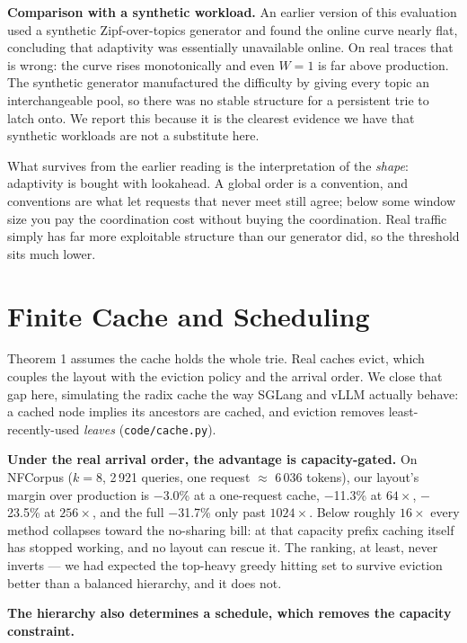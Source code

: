 \documentclass[11pt]{article}
\theoremstyle{plain}
\begin{document}
\textbf{Comparison with a synthetic workload.} An earlier version of this evaluation used a synthetic Zipf-over-topics generator and found the online curve nearly flat, concluding that adaptivity was essentially unavailable online. On real traces that is wrong: the curve rises monotonically and even $W=1$ is far above production. The synthetic generator manufactured the difficulty by giving every topic an interchangeable pool, so there was no stable structure for a persistent trie to latch onto. We report this because it is the clearest evidence we have that synthetic workloads are not a substitute here.

What survives from the earlier reading is the interpretation of the \emph{shape}: adaptivity is bought with lookahead. A global order is a convention, and conventions are what let requests that never meet still agree; below some window size you pay the coordination cost without buying the coordination. Real traffic simply has far more exploitable structure than our generator did, so the threshold sits much lower.

\section{Finite Cache and Scheduling}

Theorem 1 assumes the cache holds the whole trie. Real caches evict, which couples the layout with the eviction policy and the arrival order. We close that gap here, simulating the radix cache the way SGLang and vLLM actually behave: a cached node implies its ancestors are cached, and eviction removes least-recently-used \emph{leaves} (\texttt{code/cache.py}).

\textbf{Under the real arrival order, the advantage is capacity-gated.} On NFCorpus ($k=8$, 2\,921 queries, one request $\approx$ 6\,036 tokens), our layout's margin over production is $-$3.0\% at a one-request cache, $-$11.3\% at $64\times$, $-$23.5\% at $256\times$, and the full $-$31.7\% only past $1024\times$. Below roughly $16\times$ every method collapses toward the no-sharing bill: at that capacity prefix caching itself has stopped working, and no layout can rescue it. The ranking, at least, never inverts --- we had expected the top-heavy greedy hitting set to survive eviction better than a balanced hierarchy, and it does not.

\textbf{The hierarchy also determines a schedule, which removes the capacity constraint.}
\end{document}
